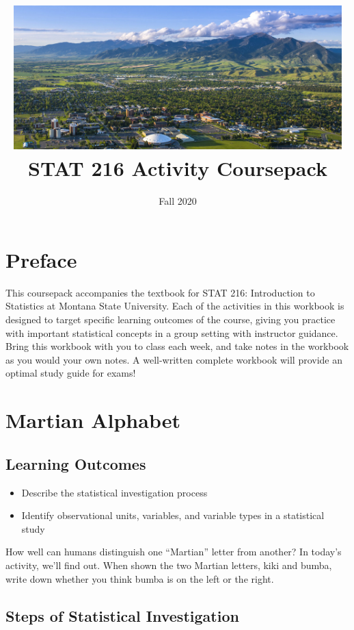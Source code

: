 \documentclass[
]{report}
\title{\includegraphics[width=5in,height=\textheight]{images/msu-campus.jpg}
\vspace{1cm}\\
STAT 216 Activity Coursepack}
\subtitle{Fall 2020}
\author{}
\date{\vspace{-2.5em}}
\begin{document}
\maketitle

{
\setcounter{tocdepth}{0}
\tableofcontents
}
\hypertarget{preface}{%
\chapter{Preface}\label{preface}}

This coursepack accompanies the textbook for STAT 216: Introduction to Statistics at Montana State University. Each of the activities in this workbook is designed to target specific learning outcomes of the course, giving you practice with important statistical concepts in a group setting with instructor guidance. Bring this workbook with you to class each week, and take notes in the workbook as you would your own notes. A well-written complete workbook will provide an optimal study guide for exams!

\hypertarget{martian-alphabet}{%
\chapter{Martian Alphabet}\label{martian-alphabet}}

\hypertarget{learning-outcomes}{%
\section{Learning Outcomes}\label{learning-outcomes}}

\begin{itemize}
\item
  Describe the statistical investigation process
\item
  Identify observational units, variables, and variable types in a statistical study
\end{itemize}

How well can humans distinguish one ``Martian'' letter from another? In today's activity, we'll find out. When shown the two Martian letters, kiki and bumba, write down whether you think bumba is on the left or the right.

\vspace{0.5in}

\hypertarget{steps-of-statistical-investigation}{%
\section{Steps of Statistical Investigation}\label{steps-of-statistical-investigation}}
\end{document}
